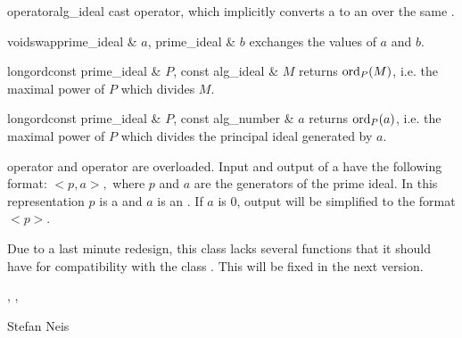 
\BASIC

\begin{cfcode}{operator}{alg_ideal}{}
  cast operator, which implicitly converts a  to an  over the
  same .
\end{cfcode}

\begin{fcode}{void}{swap}{prime_ideal & $a$, prime_ideal & $b$}
  exchanges the values of $a$ and $b$.
\end{fcode}



\HIGH

\begin{fcode}{long}{ord}{const prime_ideal & $P$, const alg_ideal & $M$}
  returns $\operatorname{ord}_P(M)$, i.e. the maximal power of $P$ which divides $M$.
\end{fcode}

\begin{fcode}{long}{ord}{const prime_ideal & $P$, const alg_number & $a$}
  returns $\operatorname{ord}_P(a)$, i.e. the maximal power of $P$ which divides the principal ideal generated
  by $a$.
\end{fcode}



\IO

 operator \code{>>} and  operator \code{<<} are overloaded.  Input
and output of a  have the following format: $< p, a >,$ where $p$ and $a$ are
the generators of the prime ideal.  In this representation $p$ is a  and $a$ is an
.  If $a$ is $0$, output will be simplified to the format $< p >$.



\WARNINGS

Due to a last minute redesign, this class lacks several functions that it should have for
compatibility with the class .  This will be fixed in the next version.



\SEEALSO

, , 



\AUTHOR

Stefan Neis
